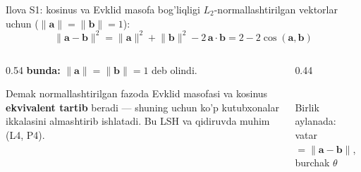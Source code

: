 \documentclass[aspectratio=169,11pt]{beamer}
\newcommand{\gcap}[1]{{\scriptsize\color{halfgray}#1}}
\newcommand{\bunda}[1]{{\small\textbf{bunda:}\; #1}}
\begin{document}
\appendix

\begin{frame}{Ilova S1: kosinus va Evklid masofa bog'liqligi}
  \small
  $L_2$-normallashtirilgan vektorlar uchun
  ($\lVert\mathbf{a}\rVert=\lVert\mathbf{b}\rVert=1$):
  $$\lVert\mathbf{a}-\mathbf{b}\rVert^2
    = \lVert\mathbf{a}\rVert^2 + \lVert\mathbf{b}\rVert^2
      - 2\,\mathbf{a}\cdot\mathbf{b}
    = 2 - 2\cos(\mathbf{a},\mathbf{b})$$
  \vspace{-2pt}
  \begin{columns}[T]
    \begin{column}{0.54\textwidth}
      \bunda{$\lVert\mathbf{a}\rVert=\lVert\mathbf{b}\rVert=1$ deb olindi.}
      \vspace{5pt}

      Demak normallashtirilgan fazoda Evklid masofasi va kosinus
      \textbf{ekvivalent tartib} beradi --- shuning uchun ko'p kutubxonalar
      ikkalasini almashtirib ishlatadi. Bu LSH va qidiruvda muhim (L4, P4).
    \end{column}
    \begin{column}{0.44\textwidth}
      \centering
      \\[2pt]
      \gcap{Birlik aylanada: vatar $=\lVert\mathbf{a}{-}\mathbf{b}\rVert$, burchak $\theta$}
    \end{column}
  \end{columns}
\end{frame}
\end{document}
